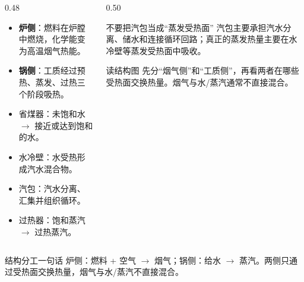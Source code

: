 \begin{frame}[t,shrink]{}
\begin{columns}[T,onlytextwidth]
\begin{column}{0.48\textwidth}
  \begin{itemize}
    \item \textbf{炉侧}：燃料在炉膛中燃烧，化学能变为高温烟气热能。
    \item \textbf{锅侧}：工质经过预热、蒸发、过热三个阶段吸热。
    \item 省煤器：未饱和水 $\rightarrow$ 接近或达到饱和的水。
    \item 水冷壁：水受热形成汽水混合物。
    \item 汽包：汽水分离、汇集并组织循环。
    \item 过热器：饱和蒸汽 $\rightarrow$ 过热蒸汽。
  \end{itemize}
\end{column}
\begin{column}{0.50\textwidth}
  \begin{amberbox}{不要把汽包当成“蒸发受热面”}
  \small 汽包主要承担汽水分离、储水和连接循环回路；真正的蒸发热量主要在水冷壁等蒸发受热面中吸收。
  \end{amberbox}
  \vspace{0.8mm}
  \begin{keybox}{读结构图}
  \small 先分“烟气侧”和“工质侧”，再看两者在哪些受热面交换热量。烟气与水/蒸汽通常不直接混合。
  \end{keybox}
\end{column}
\end{columns}
\vspace{1mm}
\begin{keybox}{结构分工一句话}
\small 炉侧：燃料 + 空气 $\rightarrow$ 烟气；锅侧：给水 $\rightarrow$ 蒸汽。两侧只通过受热面交换热量，烟气与水/蒸汽不直接混合。
\end{keybox}
\end{frame}


